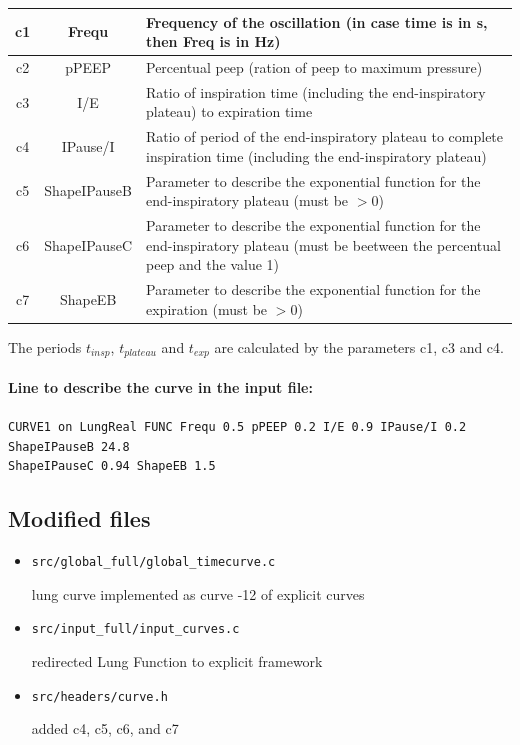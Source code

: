 \begin{tabular}{|c|c|p{125mm}|}
	\hline
	c1	& Frequ	& Frequency of the oscillation (in case time is in s, then Freq is in Hz) \\
	\hline
	c2	& pPEEP 	& Percentual peep (ration of peep to maximum pressure)\\
	\hline
	c3	& I/E 	& Ratio of inspiration time (including the end-inspiratory plateau) to expiration time \\
	\hline
	c4	& IPause/I 	& Ratio of period of the end-inspiratory plateau to complete inspiration time (including the end-inspiratory plateau)\\
	\hline
	c5	& ShapeIPauseB & Parameter to describe the exponential function for the end-inspiratory plateau (must be $>0$)\\
	\hline
	c6	& ShapeIPauseC & Parameter to describe the exponential function for the end-inspiratory plateau (must be beetween the percentual peep and the value 1)\\
	\hline
	c7	& ShapeEB 	& Parameter to describe the exponential function for the expiration (must be $>0$)\\
	\hline
\end{tabular}

\bigskip \par \noindent The periods $t_{insp}$, $t_{plateau}$ and $t_{exp}$ are calculated by the parameters c1, c3 and c4.

\paragraph*{Line to describe the curve in the input file:\\}
{\tt CURVE1 on LungReal FUNC Frequ 0.5 pPEEP 0.2 I/E 0.9 IPause/I 0.2 ShapeIPauseB 24.8 \\ ShapeIPauseC 0.94 ShapeEB 1.5}

\subsection*{Modified files}
\begin{itemize}
	\item {\tt src/global\_full/global\_timecurve.c}
	\par \noindent lung curve implemented as curve -12 of explicit curves

	\item {\tt src/input\_full/input\_curves.c}
	\par \noindent redirected Lung Function to explicit framework

	\item {\tt src/headers/curve.h}
	\par \noindent added c4, c5, c6, and c7
\end{itemize}
